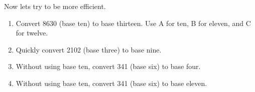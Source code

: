 \begin{prob}
Now lets try to be more efficient.  
\begin{enumerate}
\item Convert 8630 (base ten) to base thirteen.  Use A for ten, B for eleven, and C for twelve.  
\item Quickly convert 2102 (base three) to base nine.
\item Without using base ten, convert 341 (base six) to base four.  
\item Without using base ten, convert 341 (base six) to base eleven.
\end{enumerate}
\end{prob}

